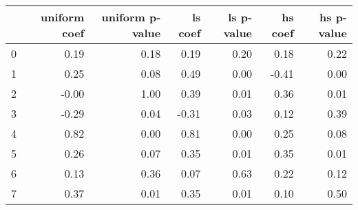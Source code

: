 \begin{tabular}{lrrrrrr}
\toprule
 & uniform coef & uniform p-value & ls coef & ls p-value & hs coef & hs p-value \\
\midrule
0 & 0.19 & 0.18 & 0.19 & 0.20 & 0.18 & 0.22 \\
1 & 0.25 & 0.08 & 0.49 & 0.00 & -0.41 & 0.00 \\
2 & -0.00 & 1.00 & 0.39 & 0.01 & 0.36 & 0.01 \\
3 & -0.29 & 0.04 & -0.31 & 0.03 & 0.12 & 0.39 \\
4 & 0.82 & 0.00 & 0.81 & 0.00 & 0.25 & 0.08 \\
5 & 0.26 & 0.07 & 0.35 & 0.01 & 0.35 & 0.01 \\
6 & 0.13 & 0.36 & 0.07 & 0.63 & 0.22 & 0.12 \\
7 & 0.37 & 0.01 & 0.35 & 0.01 & 0.10 & 0.50 \\
\bottomrule
\end{tabular}
